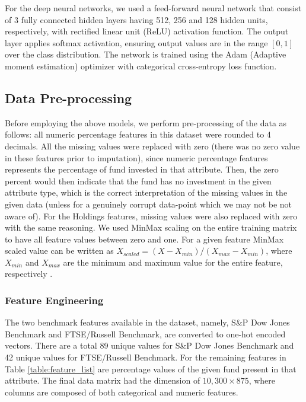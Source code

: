 \documentclass[sigconf]{acmart}
\begin{document}
For the deep neural networks, we used a feed-forward neural network that consist of 3 fully connected hidden layers having 512, 256 and 128 hidden units, respectively, with rectified linear unit (ReLU) activation function. The output layer applies softmax activation, ensuring output values are in the range $[0,1]$ over the class distribution. The network is trained using the Adam (Adaptive moment estimation) \cite{kingma2014adam} optimizer with categorical cross-entropy loss function. 


\subsection{Data Pre-processing} 
Before employing the above models, we perform pre-processing of the data as follows: all numeric percentage features in this dataset were rounded to 4 decimals. All the missing values were replaced with zero (there was no zero value in these features prior to imputation), since numeric percentage features represents the percentage of fund invested in that attribute. Then, the zero percent would then indicate that the fund has no investment in the given attribute type, which is the correct interpretation of the missing values in the given data (unless for a genuinely corrupt data-point which we may not be not aware of). For the Holdings features, missing values were also replaced with zero with the same reasoning. We used MinMax scaling on the entire training matrix to have all feature values between zero and one. For a given feature MinMax scaled value can be written as $X_{scaled}=(X - X_{min})/(X_{max}-X_{min})$, where $X_{min}$ and $X_{max}$ are the minimum and maximum value for the entire feature, respectively \cite{scikit-learn}.

\subsubsection{Feature Engineering} The two benchmark features available in the dataset, namely, S\&P Dow Jones Benchmark and FTSE/Russell Benchmark, are converted to one-hot encoded vectors. There are a total 89 unique values for S\&P Dow Jones Benchmark and 42 unique values for FTSE/Russell Benchmark. For the remaining features in Table \ref{table:feature_list} are percentage values of the given fund present in that attribute. The final data matrix had the dimension of $10,300 \times 875$, where columns are composed of both categorical and numeric features.
\end{document}

